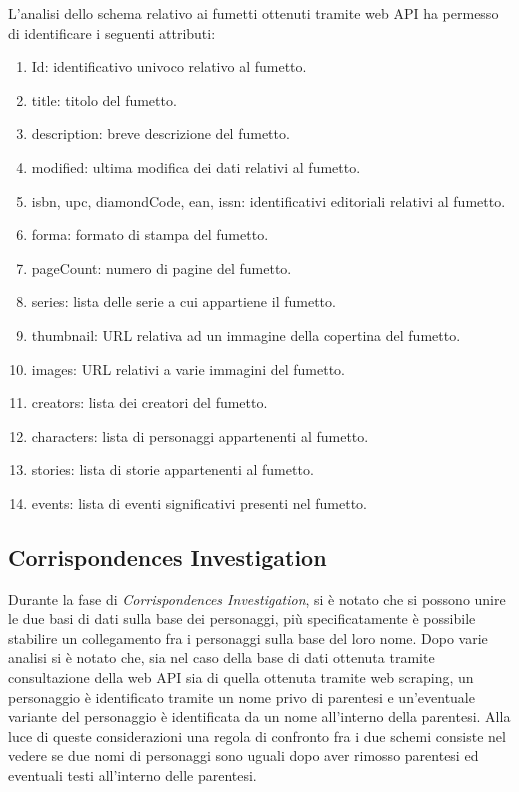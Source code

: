 \documentclass[
12pt, %
a4paper, %
oneside, %
headinclude,footinclude, %
BCOR5mm, %
]{scrartcl}
\begin{document}
L'analisi dello schema relativo ai fumetti ottenuti tramite web API ha permesso di identificare i seguenti attributi:
\begin{enumerate}
	\item Id: identificativo univoco relativo al fumetto.
	\item title: titolo del fumetto.
	\item description: breve descrizione del fumetto.
	\item modified: ultima modifica dei dati relativi al fumetto.
	\item isbn, upc, diamondCode, ean, issn: identificativi editoriali relativi al fumetto.
	\item forma: formato di stampa del fumetto.
	\item pageCount: numero di pagine del fumetto.
	\item series: lista delle serie a cui appartiene il fumetto.
	\item thumbnail: URL relativa ad un immagine della copertina del fumetto.
	\item images: URL relativi a varie immagini del fumetto.
	\item creators: lista dei creatori del fumetto.
	\item characters: lista di personaggi appartenenti al fumetto.
	\item stories: lista di storie appartenenti al fumetto.
	\item events: lista di eventi significativi presenti nel fumetto.
\end{enumerate}
\subsection{Corrispondences Investigation}
Durante la fase di \textit{Corrispondences Investigation}, si è notato che si possono unire le due basi di dati sulla base dei personaggi, più specificatamente è possibile stabilire un collegamento fra i personaggi sulla base del loro nome. Dopo varie analisi si è notato che, sia nel caso della base di dati ottenuta tramite consultazione della web API sia di quella ottenuta tramite web scraping, un personaggio è identificato tramite un nome privo di parentesi e un'eventuale variante del personaggio è identificata da un nome all'interno della parentesi. Alla luce di queste considerazioni una regola di confronto fra i due schemi consiste nel vedere se due nomi di personaggi sono uguali dopo aver rimosso parentesi ed eventuali testi all'interno delle parentesi.
\end{document}
